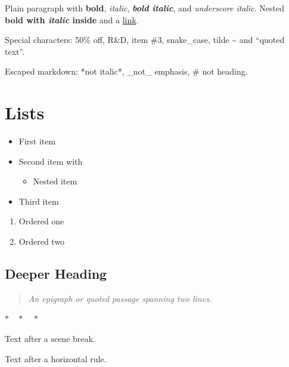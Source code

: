
Plain paragraph with \textbf{bold}, \textit{italic}, \textbf{\textit{bold italic}}, and \textit{underscore italic}. Nested \textbf{bold with \textit{italic} inside} and a \href{https://example.com/path?a=1\&b=2}{link}.

Special characters: 50\% off, R\&D, item \#3, snake\_case, tilde \textasciitilde{} and “quoted text”.

Escaped markdown: *not italic*, \_not\_ emphasis, \# not heading.

\section*{Lists}

\begin{itemize}
  \item First item
  \item Second item with 
\begin{itemize}
  \item Nested item
\end{itemize}
  \item Third item
\end{itemize}

\begin{enumerate}
  \item Ordered one
  \item Ordered two
\end{enumerate}

\subsection*{Deeper Heading}

\begin{quote}{\itshape\color{diaggray}An epigraph or quoted passage spanning two lines.}
\end{quote}

\par\bigskip\begin{center}{\fontsize{10pt}{12pt}\selectfont\textcolor{diaggray}{$\ast\quad\ast\quad\ast$}}\end{center}\par\bigskip

Text after a scene break.


Text after a horizontal rule.
